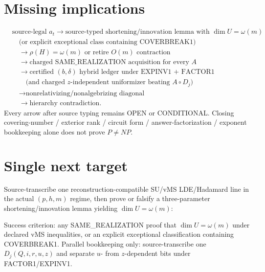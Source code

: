 \documentclass[11pt]{article}
\begin{document}
\section*{Missing implications}
\[
\begin{aligned}
&\text{source-legal }a_t
\to\text{source-typed shortening/innovation lemma with }\dim U=\omega(m)\\
&\quad\text{(or explicit exceptional class containing COVERBREAK1)}\\
&\quad\to\rho(H)=\omega(m)\text{ or retire }O(m)\text{ contraction}\\
&\quad\to\text{charged SAME\_REALIZATION acquisition for every }A\\
&\quad\to\text{certified }(b,\delta)\text{ hybrid ledger under EXPINV1 + FACTOR1}\\
&\quad\quad\text{(and charged }z\text{-independent uniformizer beating }A\circ D_j\text{)}\\
&\quad\to\text{nonrelativizing/nonalgebrizing diagonal}\\
&\quad\to\text{hierarchy contradiction}.
\end{aligned}
\]
Every arrow after source typing remains OPEN or CONDITIONAL. Closing covering-number / exterior
rank / circuit form / answer-factorization / exponent bookkeeping alone does not prove $P\neq NP$.

\section*{Single next target}
Source-transcribe one reconstruction-compatible SU/vMS LDE/Hadamard line in the actual $(p,h,m)$
regime, then prove or falsify a three-parameter shortening/innovation lemma yielding
$\dim U=\omega(m)$:
Success criterion: any SAME\_REALIZATION proof that $\dim U=\omega(m)$ under declared vMS
inequalities, or an explicit exceptional classification containing COVERBREAK1.
Parallel bookkeeping only: source-transcribe one $D_j(Q,i,r,u,z)$ and separate $u$- from
$z$-dependent bits under FACTOR1/EXPINV1.
\end{document}
